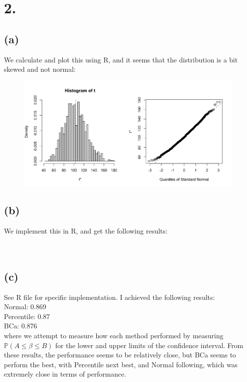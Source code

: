 \documentclass{article}
\begin{document}
\section*{2.}
{\Large

\subsection*{(a)}

We calculate and plot this using R, and it seems that the distribution is a bit skewed and not normal:
\begin{figure}[h!]
  \centering
  \includegraphics[width=500pt]{hw6_2a.png}
\end{figure}

\subsection*{(b)}

We implement this in R, and get the following results: \\
 \\
 \\

\subsection*{(c)}

See R file for specific implementation. I achieved the following results: \\
Normal: 0.869 \\ 
Percentile: 0.87 \\
BCa: 0.876 \\
where we attempt to measure how each method performed by measuring $\mathbb{P}(A \leq \beta \leq B)$ for the lower and upper limits of the confidence interval. From these results, the performance seems to be relatively close, but BCa seems to perform the best, with Percentile next best, and Normal following, which was extremely close in terms of performance.

}
\end{document}
